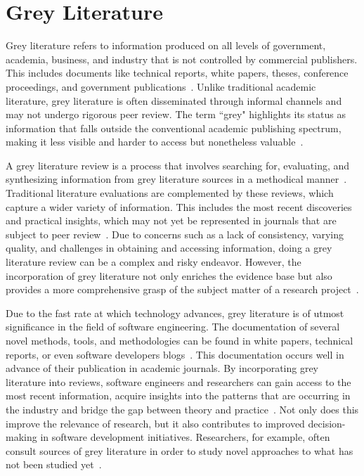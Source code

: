 \documentclass[
	msc, %
	english %
]{../ppgccufmg}
\begin{document}
    \section{Grey Literature}\label{sec:ch2-grey-literature}

        Grey literature refers to information produced on all levels of government, academia, business, and industry that is not controlled by commercial publishers. This includes documents like technical reports, white papers, theses, conference proceedings, and government publications~\cite{Farace2010}. Unlike traditional academic literature, grey literature is often disseminated through informal channels and may not undergo rigorous peer review. The term ``grey" highlights its status as information that falls outside the conventional academic publishing spectrum, making it less visible and harder to access but nonetheless valuable~\cite{Weintraub2000, Lawrence2015}.

        A grey literature review is a process that involves searching for, evaluating, and synthesizing information from grey literature sources in a methodical manner~\cite{Adams2017}. Traditional literature evaluations are complemented by these reviews, which capture a wider variety of information. This includes the most recent discoveries and practical insights, which may not yet be represented in journals that are subject to peer review~\cite{Paez2017}. Due to concerns such as a lack of consistency, varying quality, and challenges in obtaining and accessing information, doing a grey literature review can be a complex and risky endeavor. However, the incorporation of grey literature not only enriches the evidence base but also provides a more comprehensive grasp of the subject matter of a research project~\cite{Farace2010}.

        Due to the fast rate at which technology advances, grey literature is of utmost significance in the field of software engineering. The documentation of several novel methods, tools, and methodologies can be found in white papers, technical reports, or even software developers blogs~\cite{Garousi2019}. This documentation occurs well in advance of their publication in academic journals. By incorporating grey literature into reviews, software engineers and researchers can gain access to the most recent information, acquire insights into the patterns that are occurring in the industry and bridge the gap between theory and practice~\cite{Garousi2016}. Not only does this improve the relevance of research, but it also contributes to improved decision-making in software development initiatives. Researchers, for example, often consult sources of grey literature in order to study novel approaches to what has not been studied yet~\cite{Adams2017, Vegi2022, Vegi2023, Gazzinelli2023JSS}.
\end{document}
